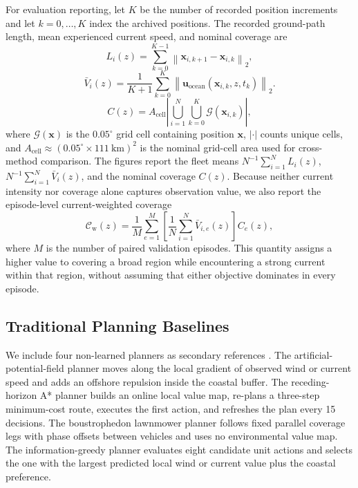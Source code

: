 \documentclass[a4paper,fleqn]{cas-dc}
\begin{document}
For evaluation reporting, let \(K\) be the number of recorded position
increments and let \(k=0,\ldots,K\) index the archived positions. The recorded
ground-path length, mean experienced current speed, and nominal coverage are
\begin{equation}
L_i(z)=\sum_{k=0}^{K-1}
\left\|\mathbf{x}_{i,k+1}-\mathbf{x}_{i,k}\right\|_2,
\label{eq:underwater_path}
\end{equation}
\begin{equation}
\bar V_i(z)=\frac{1}{K+1}\sum_{k=0}^{K}
\left\|\mathbf{u}_{\mathrm{ocean}}
(\mathbf{x}_{i,k},z,t_k)\right\|_2.
\label{eq:experienced_current}
\end{equation}
\begin{equation}
C(z)=A_{\mathrm{cell}}
\left|
\bigcup_{i=1}^{N}\bigcup_{k=0}^{K}
\mathcal{G}(\mathbf{x}_{i,k})
\right|,
\label{eq:underwater_coverage}
\end{equation}
where \(\mathcal{G}(\mathbf{x})\) is the \(0.05^\circ\) grid cell containing
position \(\mathbf{x}\), \(|\cdot|\) counts unique cells, and
\(A_{\mathrm{cell}}\approx(0.05^\circ\times111\ \mathrm{km})^2\) is the nominal
grid-cell area used for cross-method comparison.
The figures report the fleet means
\(N^{-1}\sum_{i=1}^{N}L_i(z)\), \(N^{-1}\sum_{i=1}^{N}\bar V_i(z)\), and the
nominal coverage \(C(z)\). Because neither current intensity nor coverage alone
captures observation value, we also report the episode-level current-weighted
coverage
\begin{equation}
\mathcal{C}_{\mathrm{w}}(z)=
\frac{1}{M}\sum_{e=1}^{M}
\left[
\frac{1}{N}\sum_{i=1}^{N}\bar V_{i,e}(z)
\right]C_e(z),
\label{eq:current_weighted_coverage}
\end{equation}
where \(M\) is the number of paired validation episodes. This quantity assigns
a higher value to covering a broad region while encountering a strong current
within that region, without assuming that either objective dominates in every
episode.
\subsection{Traditional Planning Baselines}\label{subsec:classical_planning}

We include four non-learned planners as secondary references
\citep{r44,r46,r48}. The artificial-potential-field planner moves along the
local gradient of observed wind or current speed and adds an offshore
repulsion inside the coastal buffer. The receding-horizon A* planner builds an
online local value map, re-plans a three-step minimum-cost route, executes the
first action, and refreshes the plan every 15 decisions. The boustrophedon
lawnmower planner follows fixed parallel coverage legs with phase offsets
between vehicles and uses no environmental value map. The information-greedy
planner evaluates eight candidate unit actions and selects the one with the
largest predicted local wind or current value plus the coastal preference.
\end{document}
